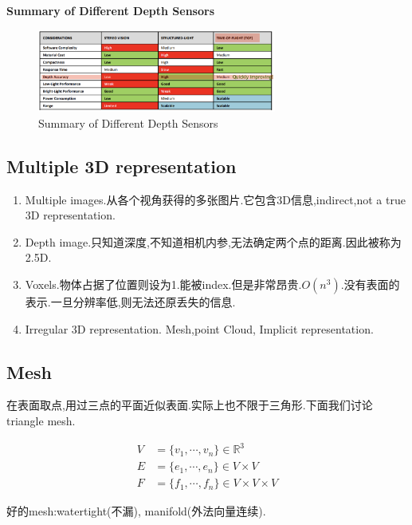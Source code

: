 \textbf{Summary of Different Depth Sensors}

\begin{figure}
    \centering
    \includegraphics[width=0.7\textwidth]{figures/sensors.png}
    \caption{Summary of Different Depth Sensors}
\end{figure}

\subsection{Multiple 3D representation}

\begin{enumerate}
    \item Multiple images.从各个视角获得的多张图片.它包含3D信息,indirect,not a true 3D representation.
    \item Depth image.只知道深度,不知道相机内参,无法确定两个点的距离.因此被称为2.5D.
    \item Voxels.物体占据了位置则设为1.能被index.但是非常昂贵.$O(n^3)$.没有表面的表示.一旦分辨率低,则无法还原丢失的信息.
    \item Irregular 3D representation. Mesh,point Cloud, Implicit representation.
\end{enumerate}

\subsection{Mesh}

在表面取点,用过三点的平面近似表面.实际上也不限于三角形.下面我们讨论triangle mesh.

\begin{equation}
    \begin{aligned}
        V &= \{v_1, \cdots, v_n\} \in \mathbb R^3
        \\
        E &= \{e_1, \cdots, e_n\} \in V\times V
        \\
        F &= \{f_1, \cdots, f_n\} \in V\times V \times V
    \end{aligned}
\end{equation}


好的mesh:watertight(不漏), manifold(外法向量连续).

